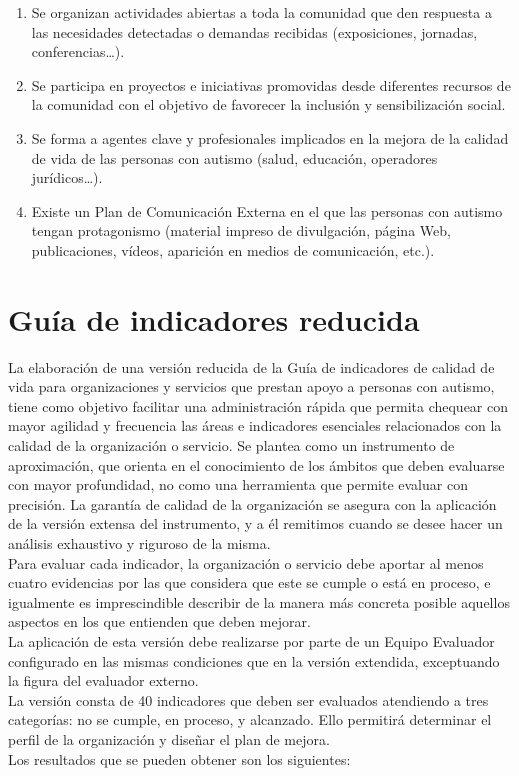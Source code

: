 \begin{itemize}
\begin{itemize}
		\begin{enumerate}
			\item Se organizan actividades abiertas a toda la comunidad que den respuesta a las necesidades detectadas o demandas recibidas (exposiciones, jornadas, conferencias…). 
			\item Se participa en proyectos e iniciativas promovidas desde diferentes recursos de la comunidad con el objetivo de favorecer la inclusión y sensibilización social. 
			\item Se forma a agentes clave y profesionales implicados en la mejora de la calidad de vida de las personas con autismo (salud, educación, operadores jurídicos…). 
			\item Existe un Plan de Comunicación Externa en el que las personas con autismo tengan protagonismo (material impreso de divulgación, página Web, publicaciones, vídeos, aparición en medios de comunicación, etc.). 
			
		\end{enumerate}
	\end{itemize}
\end{itemize}

\section{Guía de indicadores reducida}
La elaboración de una versión reducida de la Guía de indicadores de calidad de
vida para organizaciones y servicios que prestan apoyo a personas con autismo,
tiene como objetivo facilitar una administración rápida que permita chequear con
mayor agilidad y frecuencia las áreas e indicadores esenciales relacionados con
la calidad de la organización o servicio. Se plantea como un instrumento de
aproximación, que orienta en el conocimiento de los ámbitos que deben evaluarse
con mayor profundidad, no como una herramienta que permite evaluar con
precisión. La garantía de calidad de la organización se asegura con la
aplicación de la versión extensa del instrumento, y a él remitimos cuando se
desee hacer un análisis exhaustivo y riguroso de la misma. 
 \\
Para evaluar cada indicador, la organización o servicio debe aportar al menos
cuatro evidencias por las que considera que este se cumple o está en proceso, e
igualmente es imprescindible describir de la manera más concreta posible
aquellos aspectos en los que entienden que deben mejorar.  
 \\
La aplicación de esta versión debe realizarse por parte de un Equipo Evaluador configurado en las mismas condiciones que en la versión extendida, exceptuando la figura del evaluador externo.  
 \\
La versión consta de 40 indicadores que deben ser evaluados atendiendo a tres
categorías: no se cumple, en proceso, y alcanzado. Ello permitirá determinar el
perfil de la organización y diseñar el plan de mejora.  
\\
Los resultados que se pueden obtener son los siguientes:
